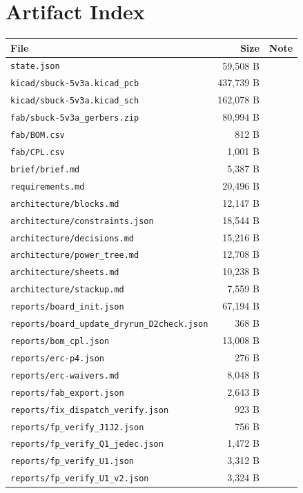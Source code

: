 \documentclass[11pt,a4paper]{article}
\begin{document}
\section{Artifact Index}
{\small
\begin{longtable}{p{9cm}rp{4cm}}
\toprule
\textbf{File} & \textbf{Size} & \textbf{Note} \\
\midrule
\endhead
\texttt{state.json} & 59,508 B &  \\
\texttt{kicad/sbuck-5v3a.kicad\_pcb} & 437,739 B &  \\
\texttt{kicad/sbuck-5v3a.kicad\_sch} & 162,078 B &  \\
\texttt{fab/sbuck-5v3a\_gerbers.zip} & 80,994 B &  \\
\texttt{fab/BOM.csv} & 812 B &  \\
\texttt{fab/CPL.csv} & 1,001 B &  \\
\texttt{brief/brief.md} & 5,387 B &  \\
\texttt{requirements.md} & 20,496 B &  \\
\texttt{architecture/blocks.md} & 12,147 B &  \\
\texttt{architecture/constraints.json} & 18,544 B &  \\
\texttt{architecture/decisions.md} & 15,216 B &  \\
\texttt{architecture/power\_tree.md} & 12,708 B &  \\
\texttt{architecture/sheets.md} & 10,238 B &  \\
\texttt{architecture/stackup.md} & 7,559 B &  \\
\texttt{reports/board\_init.json} & 67,194 B &  \\
\texttt{reports/board\_update\_dryrun\_D2check.json} & 368 B &  \\
\texttt{reports/bom\_cpl.json} & 13,008 B &  \\
\texttt{reports/erc-p4.json} & 276 B &  \\
\texttt{reports/erc-waivers.md} & 8,048 B &  \\
\texttt{reports/fab\_export.json} & 2,643 B &  \\
\texttt{reports/fix\_dispatch\_verify.json} & 923 B &  \\
\texttt{reports/fp\_verify\_J1J2.json} & 756 B &  \\
\texttt{reports/fp\_verify\_Q1\_jedec.json} & 1,472 B &  \\
\texttt{reports/fp\_verify\_U1.json} & 3,312 B &  \\
\texttt{reports/fp\_verify\_U1\_v2.json} & 3,324 B &  \\

\end{longtable}}
\end{document}
